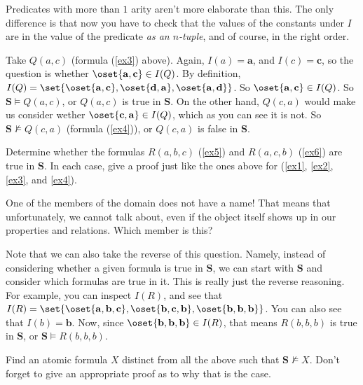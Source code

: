 Predicates with more than $1$ arity aren't more elaborate than this. The only difference is that now you have to check that the values of the constants under $I$ are in the value of the predicate \textit{as an $n$-tuple}, and of course, in the right order. 

Take $Q(a, c)$ (formula (\ref{ex3}) above). Again, $I(a)=\mathbf{a}$, and $I(c)=\mathbf{c}$, so the question is whether $\oset{\mathbf{a}, \mathbf{c}} \in I(Q)$. By definition, $I(Q)=\set{\oset{\mathbf{a}, \mathbf{c}}, \oset{\mathbf{d}, \mathbf{a}}, \oset{\mathbf{a}, \mathbf{d}}}$. So $\oset{\mathbf{a}, \mathbf{c}} \in I(Q)$. So $\mathbf{S} \models Q(a, c)$, or $Q(a,c)$ is true in $\mathbf{S}$. On the other hand, $Q(c, a)$ would make us consider wether $\oset{\mathbf{c}, \mathbf{a}} \in I(Q)$, which as you can see it is not. So $\mathbf{S}\not\models Q(c, a)$ (formula (\ref{ex4})), or $Q(c, a)$ is false in $\mathbf{S}$.

\begin{exc}
Determine whether the formulas $R(a, b, c)$ (\ref{ex5}) and $R(a, c, b)$ (\ref{ex6}) are true in $\mathbf{S}$. In each case, give a proof just like the ones above for (\ref{ex1}, \ref{ex2}, \ref{ex3}, and \ref{ex4}). \label{atomicvalue}
\end{exc} 

\begin{exc}
One of the members of the domain does not have a name! That means that unfortunately, we cannot talk about, even if the object itself shows up in our properties and relations. Which member is this?
\end{exc}

Note that we can also take the reverse of this question. Namely, instead of considering whether a given formula is true in $\mathbf{S}$, we can start with $\mathbf{S}$ and consider which formulas are true in it. This is really just the reverse reasoning. For example, you can inspect $I(R)$, and see that $I(R)=\set{\oset{\mathbf{a}, \mathbf{b}, \mathbf{c}}, \oset{\mathbf{b}, \mathbf{c}, \mathbf{b}}, \oset{\mathbf{b}, \mathbf{b}, \mathbf{b}}}$. You can also see that $I(b)=\mathbf{b}$. Now, since $\oset{\mathbf{b}, \mathbf{b}, \mathbf{b}} \in I(R)$, that means $R(b, b, b)$ is true in $\mathbf{S}$, or $\mathbf{S} \models R(b, b, b)$. 

\begin{exc}
Find an atomic formula $X$ distinct from all the above such that $\mathbf{S} \not\models X$. Don't forget to give an appropriate proof as to why that is the case. 
\end{exc}

